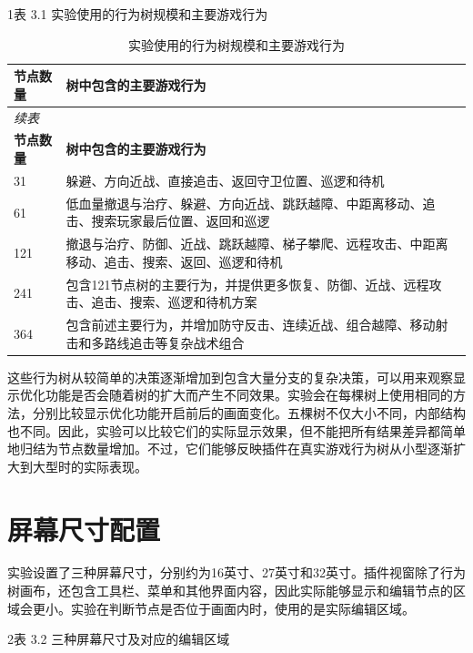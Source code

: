 \documentclass[11pt,a4paper,oneside,extrafontsizes]{memoir}
\begin{document}
1表 3.1 实验使用的行为树规模和主要游戏行为

\begin{center}

\begin{longtable}{@{}p{} p{}@{}}
\caption{实验使用的行为树规模和主要游戏行为}\label{tab:experiment-tree-sizes}\\
\toprule
\textbf{节点数量} & \textbf{树中包含的主要游戏行为} \\
\midrule
\endfirsthead
\multicolumn{2}{l}{\itshape 续表}\\
\toprule
\textbf{节点数量} & \textbf{树中包含的主要游戏行为} \\
\midrule
\endhead
31 & 躲避、方向近战、直接追击、返回守卫位置、巡逻和待机 \\
61 & 低血量撤退与治疗、躲避、方向近战、跳跃越障、中距离移动、追击、搜索玩家最后位置、返回和巡逻 \\
121 & 撤退与治疗、防御、近战、跳跃越障、梯子攀爬、远程攻击、中距离移动、追击、搜索、返回、巡逻和待机 \\
241 & 包含121节点树的主要行为，并提供更多恢复、防御、近战、远程攻击、追击、搜索、巡逻和待机方案 \\
364 & 包含前述主要行为，并增加防守反击、连续近战、组合越障、移动射击和多路线追击等复杂战术组合 \\
\bottomrule
\end{longtable}
\end{center}

这些行为树从较简单的决策逐渐增加到包含大量分支的复杂决策，可以用来观察显示优化功能是否会随着树的扩大而产生不同效果。实验会在每棵树上使用相同的方法，分别比较显示优化功能开启前后的画面变化。五棵树不仅大小不同，内部结构也不同。因此，实验可以比较它们的实际显示效果，但不能把所有结果差异都简单地归结为节点数量增加。不过，它们能够反映插件在真实游戏行为树从小型逐渐扩大到大型时的实际表现。

\section{屏幕尺寸配置}

实验设置了三种屏幕尺寸，分别约为16英寸、27英寸和32英寸。插件视窗除了行为树画布，还包含工具栏、菜单和其他界面内容，因此实际能够显示和编辑节点的区域会更小。实验在判断节点是否位于画面内时，使用的是实际编辑区域。

2表 3.2 三种屏幕尺寸及对应的编辑区域
\end{document}
